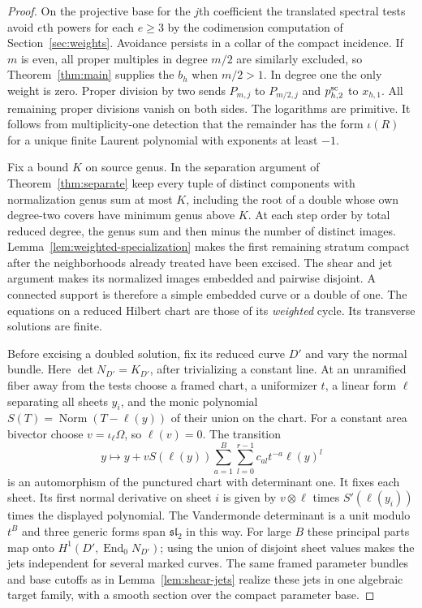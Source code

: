 \begin{proof}
On the projective base for the $j$th coefficient the translated
spectral tests avoid $e$th powers for each $e\ge3$ by the
codimension computation of Section~\ref{sec:weights}. Avoidance
persists in a collar of the compact incidence. If $m$ is even, all
proper multiples in degree $m/2$ are similarly excluded, so
Theorem~\ref{thm:main} supplies the $b_h$ when $m/2>1$.
In degree one the only weight is zero. Proper division by two
sends $P_{m,j}$ to $P_{m/2,j}$ and $p_{h,2}^{\rm sc}$ to $x_{h,1}$.
All remaining proper divisions vanish on both sides. The logarithms
are primitive. It follows from multiplicity-one detection that the
remainder has the form $\iota(R)$ for a unique finite Laurent
polynomial with exponents at least $-1$.

Fix a bound $K$ on source genus. In the separation argument of
Theorem~\ref{thm:separate} keep every tuple of distinct components
with normalization genus sum at most $K$, including the root of a
double whose own degree-two covers have minimum genus above $K$.
At each step order by total reduced degree, the genus sum and then
minus the number of distinct images. Lemma~\ref{lem:weighted-specialization}
makes the first remaining stratum compact after the neighborhoods
already treated have been excised. The shear and jet argument makes
its normalized images embedded and pairwise disjoint. A connected
support is therefore a simple embedded curve or a double of one.
The equations on a reduced Hilbert chart are those of its
\emph{weighted} cycle. Its transverse solutions are finite.

Before excising a doubled solution, fix its reduced curve $D'$ and
vary the normal bundle. Here $\det N_{D'}=K_{D'}$, after trivializing
a constant line. At an unramified fiber away from the tests choose
a framed chart, a uniformizer $t$, a linear form $\ell$ separating
all sheets $y_i$, and the monic polynomial
$S(T)=\operatorname{Norm}(T-\ell(y))$ of their union on the chart.
For a constant area bivector choose $v=\iota_\ell\Omega$, so
$\ell(v)=0$. The transition
\[
 y\longmapsto y+v S(\ell(y))
          \sum_{a=1}^{B}\sum_{l=0}^{r-1}c_{al}t^{-a}\ell(y)^l
\]
is an automorphism of the punctured chart with determinant one.
It fixes each sheet. Its first normal derivative on sheet $i$ is
given by $v\otimes\ell$ times $S'(\ell(y_i))$ times the displayed
polynomial. The Vandermonde determinant is a unit modulo $t^B$ and
three generic forms span $\mathfrak{sl}_2$ in this way.
For large $B$ these principal parts map onto
$H^1(D',\operatorname{End}_0 N_{D'})$; using the union of disjoint
sheet values makes the jets independent for several marked curves.
The same framed parameter bundles and base cutoffs as in
Lemma~\ref{lem:shear-jets} realize these jets in one algebraic
target family, with a smooth section over the compact parameter base.


\end{proof}
